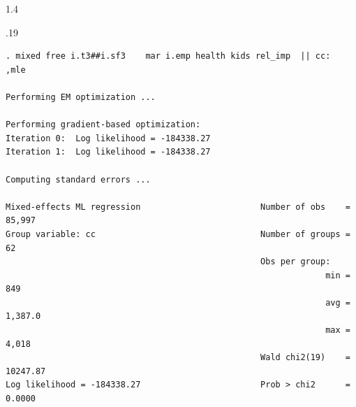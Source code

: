 \documentclass[10pt, letterpaper]{article}
\begin{document}
\begin{spacing}{1.4}
\begin{scriptsize}
\begin{spacing}{.19} 
\begin{verbatim}
. mixed free i.t3##i.sf3    mar i.emp health kids rel_imp  || cc:   ,mle

Performing EM optimization ...

Performing gradient-based optimization: 
Iteration 0:  Log likelihood = -184338.27  
Iteration 1:  Log likelihood = -184338.27  

Computing standard errors ...

Mixed-effects ML regression                        Number of obs    =   85,997
Group variable: cc                                 Number of groups =       62
                                                   Obs per group:
                                                                min =      849
                                                                avg =  1,387.0
                                                                max =    4,018
                                                   Wald chi2(19)    = 10247.87
Log likelihood = -184338.27                        Prob > chi2      =   0.0000


\end{verbatim}
\end{spacing}
\end{scriptsize}
\end{spacing}
\end{document}
